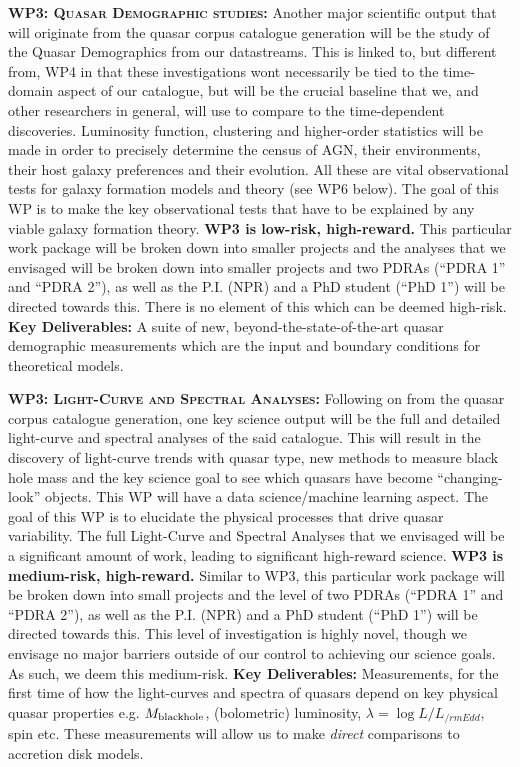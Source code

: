 \documentclass[oneside, a4paper, onecolumn, 11pt]{article}
\begin{document}
\smallskip
\smallskip
\noindent
\textbf{\textsc{WP3: Quasar Demographic studies:}} 
Another major scientific output that will originate from the quasar
corpus catalogue generation will be the study of the Quasar
Demographics from our datastreams. This is linked to, but different from, WP4 in that
these investigations wont necessarily be tied to the time-domain
aspect of our catalogue, but will be the crucial baseline that we, and
other researchers in general, will use to compare to the time-dependent
discoveries. Luminosity function, clustering and higher-order
statistics will be made in order to precisely determine the census of
AGN, their environments, their host galaxy preferences and their
evolution. All these are vital observational tests for galaxy
formation models and theory (see WP6 below).
The goal of this WP is to make the key observational tests that have
to be explained by any viable galaxy formation theory.  
{\bf WP3 is low-risk, high-reward.}
This particular work package will be broken down into smaller projects
and the analyses that we envisaged will be broken down into smaller
projects and two PDRAs (``PDRA 1'' and ``PDRA 2''), as
well as the P.I. (NPR) and a PhD student (``PhD 1'') will be directed
towards this. There is no element of this which can be deemed
high-risk.
{\bf Key Deliverables:} A suite of new, beyond-the-state-of-the-art 
quasar demographic measurements which are the input 
and boundary conditions for theoretical models. 


\smallskip
\smallskip
\noindent
\textbf{\textsc{WP3: Light-Curve and Spectral Analyses:}} 
Following on from the quasar corpus catalogue generation, one key
science output will be the full and detailed light-curve and spectral
analyses of the said catalogue. This will result in the discovery of
light-curve trends with quasar type, new methods to measure black hole
mass and the key science goal to see which quasars have become
``changing-look'' objects. This WP will have a data science/machine learning 
aspect.
The goal of this WP is to elucidate the physical processes that drive quasar variability.
The full Light-Curve and Spectral
Analyses that we envisaged will be a significant amount of work,
leading to significant high-reward science. 
{\bf WP3 is medium-risk, high-reward.}
Similar to WP3, this particular work
package will be broken down into small projects and the level of two
PDRAs (``PDRA 1'' and ``PDRA 2''), as well as the P.I. (NPR) and a PhD
student (``PhD 1'') will be directed towards this. This level of investigation 
is highly novel, though we envisage no major barriers outside of our control to
 achieving our science goals. As such, we deem this medium-risk.
{\bf Key Deliverables:} Measurements, for the first time of how the 
light-curves and spectra of quasars depend on key physical 
quasar properties e.g. $M_{\rm black hole}$, (bolometric) luminosity, $\lambda = \log L / L_{/rm Edd}$, spin etc. 
These measurements will allow us to make {\it direct} comparisons to accretion disk models. 
\end{document}
